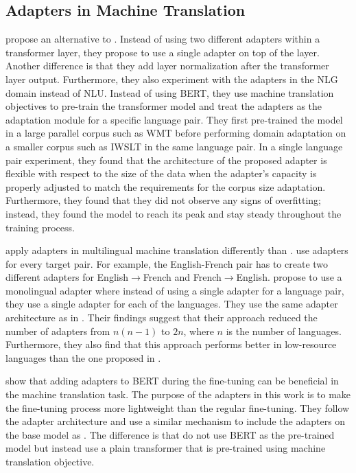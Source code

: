 \subsection{Adapters in Machine Translation}
\label{sec:app_mt}
 propose an alternative to . Instead of using two different adapters within a transformer layer, they propose to use a single adapter on top of the layer. Another difference is that they add layer normalization after the transformer layer output. Furthermore, they also experiment with the adapters in the NLG domain instead of NLU. Instead of using BERT, they use machine translation objectives to pre-train the transformer model and treat the adapters as the adaptation module for a specific language pair. They first pre-trained the model in a large parallel corpus such as WMT before performing domain adaptation on a smaller corpus such as IWSLT in the same language pair. In a single language pair experiment, they found that the architecture of the proposed adapter is flexible with respect to the size of the data when the adapter's capacity is properly adjusted to match the requirements for the corpus size adaptation. Furthermore, they found that they did not observe any signs of overfitting; instead, they found the model to reach its peak and stay steady throughout the training process.

 apply adapters in multilingual machine translation differently than .  use adapters for every target pair. For example, the English-French pair has to create two different adapters for English$\rightarrow$French and French$\rightarrow$English.  propose to use a monolingual adapter where instead of using a single adapter for a language pair, they use a single adapter for each of the languages. They use the same adapter architecture as in . Their findings suggest that their approach reduced the number of adapters from $n(n-1)$ to $2n$, where $n$ is the number of languages. Furthermore, they also find that this approach performs better in low-resource languages than the one proposed in .

 show that adding adapters to BERT during the fine-tuning can be beneficial in the machine translation task. The purpose of the adapters in this work is to make the fine-tuning process more lightweight than the regular fine-tuning. They follow the adapter architecture and use a similar mechanism to include the adapters on the base model as . The difference is that  do not use BERT as the pre-trained model but instead use a plain transformer that is pre-trained using machine translation objective.
